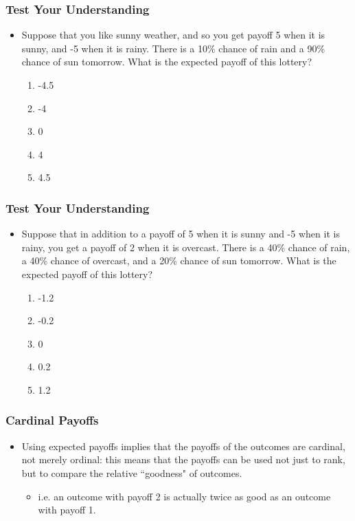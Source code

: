 
\begin{frame}
\frametitle{Test Your Understanding}
\begin{itemize}
	\item Suppose that you like sunny weather, and so you get payoff 5 when it is sunny, and -5 when it is rainy. There is a 10\% chance of rain and a 90\% chance of sun tomorrow. What is the expected payoff of this lottery?
	\begin{enumerate}
		\item -4.5
		\item -4
		\item 0
		\item 4
		\item 4.5
	\end{enumerate}
\end{itemize}
\end{frame}


\begin{frame}
\frametitle{Test Your Understanding}
\begin{itemize}
\item Suppose that in addition to a payoff of 5 when it is sunny and -5 when it is rainy, you get a payoff of 2 when it is overcast. There is a 40\% chance of rain, a 40\% chance of overcast, and a 20\% chance of sun tomorrow. What is the expected payoff of this lottery?
\begin{enumerate}
	\item -1.2
	\item -0.2
	\item 0
	\item 0.2
	\item 1.2
\end{enumerate}
\end{itemize}
\end{frame}


\begin{frame}
\frametitle{Cardinal Payoffs}
\begin{itemize}
\item Using expected payoffs implies that the payoffs of the outcomes are \alert{cardinal}, not merely ordinal: this means that the payoffs can be used not just to rank, but to compare the relative ``goodness" of outcomes.
\begin{itemize}
	\item i.e. an outcome with payoff 2 is actually twice as good as an outcome with payoff 1.
\end{itemize}
\end{itemize}
\end{frame}

